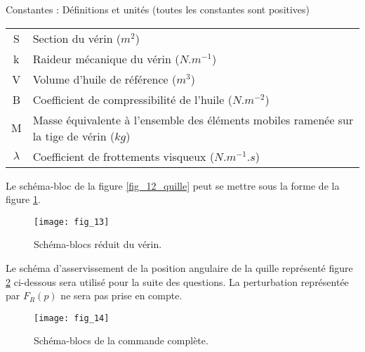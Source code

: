 \begin{center}
Constantes : Définitions et unités (toutes les constantes sont positives)
\begin{tabular}{cl}
\hline
S & 	Section du vérin ($\si{m^2}$) \\
k & 	Raideur mécanique du vérin ($\si{N.m^{-1}}$) \\
V & 	Volume d’huile de référence ($\si{m^3}$) \\		
B &	Coefficient de compressibilité de l’huile ($\si{N.m^{-2}}$)\\
M &	Masse équivalente à l’ensemble des éléments mobiles ramenée sur la tige de vérin ($\si{kg}$) \\
$\lambda$  & Coefficient de frottements visqueux ($\si{N.m^{-1}.s}$) \\
\hline
\end{tabular}
\end{center}




Le schéma-bloc de la figure \ref{fig_12_quille} peut se mettre sous la forme de la figure \ref{fig_13_quille}.



\begin{figure}[!h]
\centering
\texttt{[image: fig\_13]}
\caption{Schéma-blocs réduit du vérin. \label{fig_13_quille}}
\end{figure}



Le schéma d’asservissement de la position angulaire de la quille représenté figure \ref{fig_14_quille} ci-dessous sera utilisé pour la suite des questions. La perturbation représentée par $F_R(p)$ ne sera pas prise en compte.

\begin{figure}[!h]
\centering
\texttt{[image: fig\_14]}
\caption{Schéma-blocs de la commande complète. \label{fig_14_quille}}
\end{figure}


